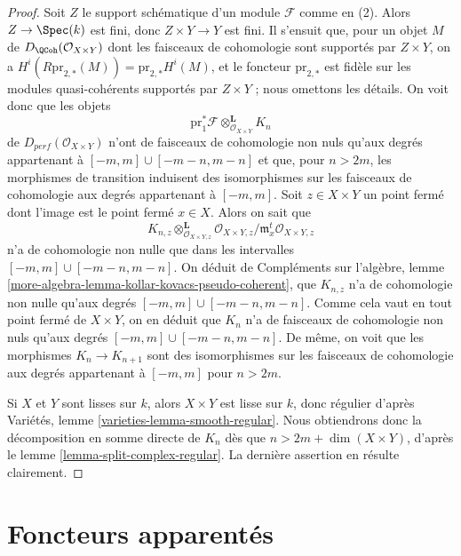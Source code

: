\begin{proof}
Soit $Z$ le support schématique d'un module $\mathcal{F}$ comme en (2).
Alors $Z \to \Spec(k)$ est fini, donc $Z \times Y \to Y$ est fini.
Il s'ensuit que, pour un objet $M$ de $D_\QCoh(\mathcal{O}_{X \times Y})$
dont les faisceaux de cohomologie sont supportés par $Z \times Y$, on a
$H^i(R\text{pr}_{2, *}(M)) = \text{pr}_{2, *}H^i(M)$, et le foncteur
$\text{pr}_{2, *}$ est fidèle sur les modules quasi-cohérents supportés
par $Z \times Y$ ; nous omettons les détails. On voit donc que les objets
$$
\text{pr}_1^*\mathcal{F} \otimes_{\mathcal{O}_{X \times Y}}^\mathbf{L} K_n
$$
de $D_{perf}(\mathcal{O}_{X \times Y})$ n'ont de faisceaux de cohomologie non nuls
qu'aux degrés appartenant à $[-m, m] \cup [-m - n, m - n]$ et que, pour $n > 2m$, les morphismes de transition
induisent des isomorphismes sur les faisceaux de cohomologie aux degrés appartenant à $[-m, m]$.
Soit $z \in X \times Y$ un point fermé dont l'image est le point fermé
$x \in X$. Alors on sait que
$$
K_{n, z} \otimes_{\mathcal{O}_{X \times Y, z}}^\mathbf{L}
\mathcal{O}_{X \times Y, z}/\mathfrak m_x^t\mathcal{O}_{X \times Y, z}
$$
n'a de cohomologie non nulle que dans les intervalles
$[-m, m] \cup [-m - n, m - n]$.
On déduit de Compléments sur l'algèbre, lemme
\ref{more-algebra-lemma-kollar-kovacs-pseudo-coherent},
que $K_{n, z}$ n'a de cohomologie non nulle
qu'aux degrés $[-m, m] \cup [-m - n, m - n]$. Comme cela vaut en tout
point fermé de $X \times Y$, on en déduit que $K_n$ n'a de faisceaux de cohomologie non nuls
qu'aux degrés $[-m, m] \cup [-m - n, m - n]$.
De même, on voit que les morphismes $K_n \to K_{n + 1}$
sont des isomorphismes sur les faisceaux de cohomologie aux degrés appartenant à $[-m, m]$
pour $n > 2m$.

\medskip\noindent
Si $X$ et $Y$ sont lisses sur $k$, alors $X \times Y$ est lisse
sur $k$, donc régulier d'après
Variétés, lemme \ref{varieties-lemma-smooth-regular}.
Nous obtiendrons donc la décomposition en somme directe de $K_n$
dès que $n > 2m + \dim(X \times Y)$, d'après
le lemme \ref{lemma-split-complex-regular}. La dernière assertion
en résulte clairement.
\end{proof}





\section{Foncteurs apparentés}
\label{section-sibling}

